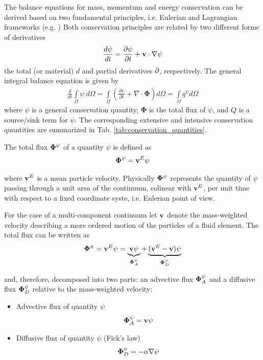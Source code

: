 The balance equations for mass, momentum and energy conservation can be derived based on two fundamental principles, i.e. Eulerian and Lagrangian frameworks (e.g. \cite{Kol:02})
%
Both conservation principles are related by two different forms of derivatives
\begin{equation}
\frac{d \psi}{dt}
=
\frac{\p \psi}{\p t} + \v\cdot\nabla\psi
\label{eqn:derivatives}
\end{equation}
the total (or material) $d$ and partial derivatives $\partial$, respectively.
%
The general integral balance equation is given by
%
\begin{eqnarray}
\frac{d}{dt} \int\limits_\Omega \psi~d\Omega
=
\int\limits_\Omega
\left(
\frac{\partial\psi}{\partial t}
+
\nabla \cdot {\mathbf{\Phi}}
\right)
d\Omega
=
\int\limits_\Omega q^\psi d\Omega
\label{eqn:general_balance_equation}
\end{eqnarray}
%
where $\psi$ is a general conservation quantity, $\mathbf{\Phi}$ is the total flux of $\psi$, and $Q$ is a source/sink term for $\psi$.
%
The corresponding extensive and intensive conservation quantities are summarized in Tab. \ref{tab:conservation_quantities}.

The total flux ${\bf\Phi}^\psi$ of a quantity $\psi$ is defined as
\begin{eqnarray}
{\bf\Phi}^\psi
=
{\bf v}^E \psi
\end{eqnarray}

where ${\bf v}^E$ is a mean particle velocity. Physically ${\bf\Phi}^\psi$ represents the quantity of
$\psi$ passing through a unit area of the continuum, colinear with
${\bf v}^E$, per unit time with respect to a fixed coordinate
syste, i.e. Eulerian point of view.

For the case of a multi-component continuum let ${\bf v}$ denote
the mass-weighted velocity
describing a more ordered motion of the particles of a fluid
element. The total flux can be written as
\begin{eqnarray}
{\bf\Phi}^\psi
=
{\bf v}^E \psi
=
\underbrace{{\bf v} \psi}_{{\bf\Phi}^\psi_A}
+
\underbrace{({\bf v}^E-{\bf v}) \psi}_{{\bf\Phi}^\psi_D}
\end{eqnarray}

and, therefore, decomposed into two parts: an advective flux
${\bf\Phi}^\psi_A$ and a diffusive flux ${\bf\Phi}^\psi_D$
relative to the mass-weighted velocity:

\begin{itemize}
 \item
Advective flux of quantity $\psi$
\begin{eqnarray}
{\bf\Phi}^\psi_A
=
{\bf v}\psi
\end{eqnarray}

 \item
Diffusive flux of quantity $\psi$
(Fick's law)
\begin{eqnarray}
{\bf\Phi}^\psi_D=
-\alpha \nabla\psi
\end{eqnarray}
\end{itemize}

